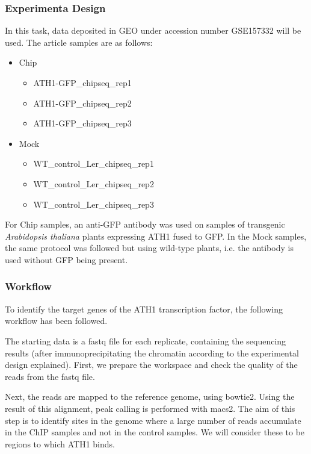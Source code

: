 \documentclass[
]{article}
\providecommand{\tightlist}{%
  \setlength{\itemsep}{0pt}\setlength{\parskip}{0pt}}
\begin{document}
\hypertarget{experimenta-design}{%
\subsubsection{Experimenta Design}\label{experimenta-design}}

In this task, data deposited in GEO under accession number GSE157332
will be used. The article samples are as follows:

\begin{itemize}
\item
  Chip

  \begin{itemize}
  \tightlist
  \item
    ATH1-GFP\_chipseq\_rep1
  \item
    ATH1-GFP\_chipseq\_rep2
  \item
    ATH1-GFP\_chipseq\_rep3
  \end{itemize}
\item
  Mock

  \begin{itemize}
  \tightlist
  \item
    WT\_control\_Ler\_chipseq\_rep1
  \item
    WT\_control\_Ler\_chipseq\_rep2
  \item
    WT\_control\_Ler\_chipseq\_rep3
  \end{itemize}
\end{itemize}

For Chip samples, an anti-GFP antibody was used on samples of transgenic
\emph{Arabidopsis thaliana} plants expressing ATH1 fused to GFP. In the
Mock samples, the same protocol was followed but using wild-type plants,
i.e. the antibody is used without GFP being present.

\hypertarget{workflow}{%
\subsubsection{Workflow}\label{workflow}}

To identify the target genes of the ATH1 transcription factor, the
following workflow has been followed.

The starting data is a fastq file for each replicate, containing the
sequencing results (after immunoprecipitating the chromatin according to
the experimental design explained). First, we prepare the workspace and
check the quality of the reads from the fastq file.

Next, the reads are mapped to the reference genome, using bowtie2. Using
the result of this alignment, peak calling is performed with macs2. The
aim of this step is to identify sites in the genome where a large number
of reads accumulate in the ChIP samples and not in the control samples.
We will consider these to be regions to which ATH1 binds.
\end{document}

